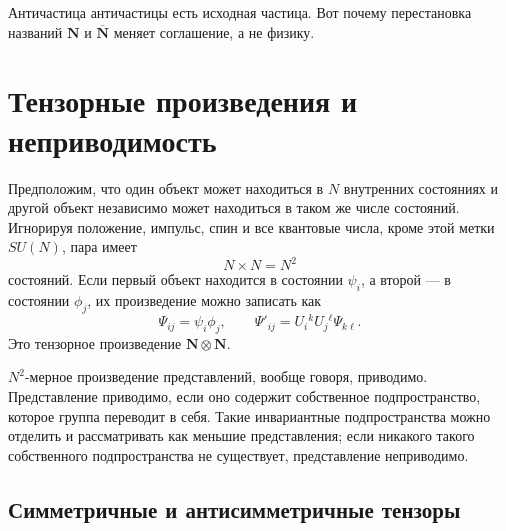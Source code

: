 Античастица античастицы есть исходная частица. Вот почему перестановка названий \(\mathbf N\) и \(\overline{\mathbf N}\) меняет соглашение, а не физику.

\section{Тензорные произведения и неприводимость}

Предположим, что один объект может находиться в \(N\) внутренних состояниях и другой объект независимо может находиться в таком же числе состояний. Игнорируя положение, импульс, спин и все квантовые числа, кроме этой метки \(SU(N)\), пара имеет
\begin{equation}
N\times N=N^2
\label{eq:l10-product-count}
\end{equation}
состояний. Если первый объект находится в состоянии \(\psi_i\), а второй — в состоянии \(\phi_j\), их произведение можно записать как
\begin{equation}
\Psi_{ij}=\psi_i\phi_j,
\qquad
\Psi'_{ij}=U_i{}^kU_j{}^\ell\Psi_{k\ell}.
\label{eq:l10-tensor-transform}
\end{equation}
Это тензорное произведение \(\mathbf N\otimes\mathbf N\).

\begin{classroomqa}
\end{classroomqa}

\(N^2\)-мерное произведение представлений, вообще говоря, приводимо. Представление приводимо, если оно содержит собственное подпространство, которое группа переводит в себя. Такие инвариантные подпространства можно отделить и рассматривать как меньшие представления; если никакого такого собственного подпространства не существует, представление неприводимо.

\subsection{Симметричные и антисимметричные тензоры}

